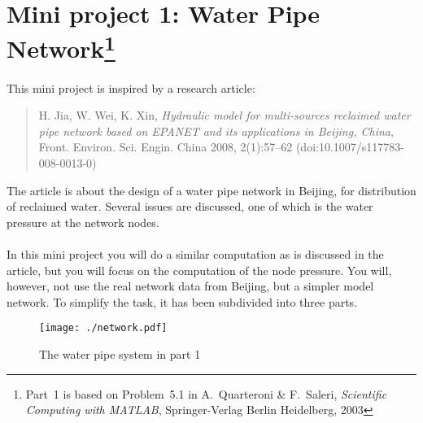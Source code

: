 \documentclass[11pt,a4paper]{article}
\begin{document}
\section*{Mini project 1: Water Pipe Network\footnote{Part~1 is based on
Problem~5.1 in A.~Quarteroni \& F.~Saleri, \emph{Scientific Computing with MATLAB},
Springer-Verlag Berlin Heidelberg, 2003}
}

This mini project is inspired by a research article:
\begin{quotation}\noindent
H. Jia, W. Wei, K. Xin, \emph{Hydraulic model for multi-sources reclaimed water pipe network based on EPANET and its applications in Beijing, China}, Front. Environ. Sci. Engin. China 2008, 2(1):57--62 (doi:10.1007/s117783-008-0013-0)
\end{quotation}
The article is about the design of a water pipe network in Beijing, for distribution of reclaimed water. Several issues are discussed, one of which is the water pressure at the network nodes.
\\
\\
In this mini project you will do a similar computation as is discussed in the article, but you will focus on the computation of the node pressure. You will, however, not use the real network data from Beijing, but a simpler model network. To simplify the task, it has been subdivided into three parts. 
\bigskip \bigskip
\begin{figure}[hp]
\centering
\texttt{[image: ./network.pdf]}
\caption{The water pipe system in part 1}
 \end{figure}

\newpage
\end{document}
